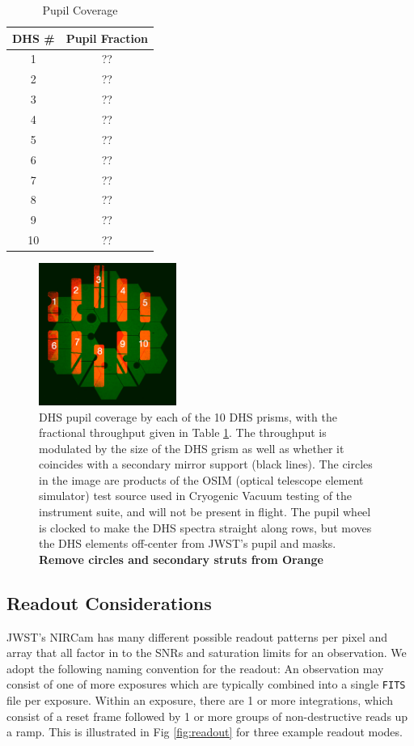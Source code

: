 \documentclass[iop]{emulateapj}
\begin{document}
\begin{table}
\centering
\begin{tabular}{cc}
DHS \# & Pupil Fraction \\
\hline \hline
1 & ?? \\
2 & ?? \\
3 & ?? \\
4 & ?? \\
5 & ?? \\
6 & ?? \\
7 & ?? \\
8 & ?? \\
9 & ?? \\
10 &??  \\
\end{tabular}
\caption{Pupil Coverage}\label{tab:pupfrac}
\label{tab:pupfrac}
\end{table}

\begin{figure}
\centering
\includegraphics[width=0.4\textwidth]{dhs_pupil_overlay.png}
\caption{DHS pupil coverage by each of the 10 DHS prisms, with the fractional throughput given in Table \ref{tab:pupfrac}. 
The throughput is modulated by the size of the DHS grism as well as whether it coincides with a secondary mirror support (black lines).
The circles in the image are products of the OSIM (optical telescope element simulator) test source used in Cryogenic Vacuum testing of the instrument suite, and will not be present in flight.
The pupil wheel is clocked to make the DHS spectra straight along rows, but moves the DHS elements off-center from JWST's pupil and masks.
\textbf{Remove circles and secondary struts from Orange}}\label{fig:DHSvsPupilOverlay}
\end{figure}

\subsection{Readout Considerations}\label{sec:readout}
JWST's NIRCam has many different possible readout patterns per pixel and array that all factor in to the SNRs and saturation limits for an observation.
We adopt the following naming convention for the readout: An observation may consist of one of more exposures which are typically combined into a single \texttt{FITS} file per exposure.
Within an exposure, there are 1 or more integrations, which consist of a reset frame followed by 1 or more groups of non-destructive reads up a ramp.
This is illustrated in Fig \ref{fig:readout} for three example readout modes.
\end{document}
